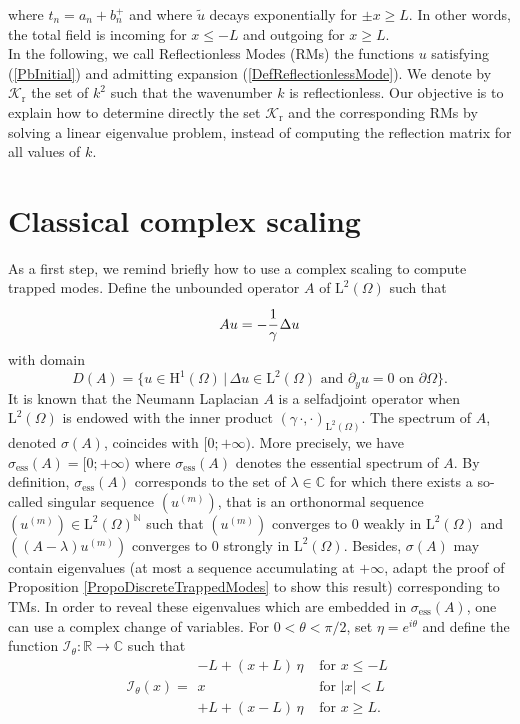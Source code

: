 \documentclass[11pt,a4paper]{report}
\newcommand{\Om}{\Omega}
\newcommand{\mrm}[1]{\mathrm{#1}}
\newcommand{\Cplx}{\mathbb{C}}
\newcommand{\N}{\mathbb{N}}
\newcommand{\R}{\mathbb{R}}
\newcommand{\mL}{\mrm{L}}
\newcommand{\mH}{\mrm{H}}
\begin{document}
where $t_n=a_n+b_n^+$ and where $\tilde{u}$ decays exponentially for $\pm x\ge L$. In other words, the total field is incoming for $x\le-L$ and outgoing for $x\ge L$.\\
\newline
In the following,  we call Reflectionless Modes (RMs) the functions $u$ satisfying (\ref{PbInitial}) and admitting expansion (\ref{DefReflectionlessMode}). We denote by $\mathscr{K}_{\mrm{r}}$ the set of $k^2$ such that the wavenumber $k$ is reflectionless. Our objective is to explain how to determine directly the set $\mathscr{K}_{\mrm{r}}$ and the corresponding RMs by solving a linear eigenvalue problem, instead of computing the reflection matrix for all values of $k$.  

\section{Classical complex scaling}\label{SectionClassical}
As a first step, we remind briefly how to use a complex scaling to compute trapped modes. Define the unbounded operator $A$ of $\mL^2(\Om)$ such that
\[ 
Au=-\cfrac{1}{\gamma}\,\Delta u
\]
with domain 
\[
D(A)=\{u\in\mH^1(\Om)\,|\,\Delta u\in \mL^2(\Om)\mbox{ and }\partial_{y}u=0\mbox{ on }\partial\Om\}.
\] 
It is known that the Neumann Laplacian $A$ is a selfadjoint operator when $\mL^2(\Om)$ is endowed with the inner product $(\gamma\,\cdot,\cdot)_{\mL^2(\Om)}$. The spectrum of $A$, denoted $\sigma(A)$, coincides with $[0;+\infty)$. More precisely, we have $\sigma_{\mrm{ess}}(A)=[0;+\infty)$ where $\sigma_{\mrm{ess}}(A)$ denotes the essential spectrum of $A$. By definition, $\sigma_{\mrm{ess}}(A)$ corresponds to the set of $\lambda \in\Cplx$ for which there exists a so-called singular sequence $(u^{(m)})$, that is an orthonormal sequence $(u^{(m)})\in\mL^2(\Omega)^{\N}$ such that $(u^{(m)})$ converges to 0 weakly in $\mL^2(\Omega)$ and $((A-\lambda)u^{(m)})$ converges to 0 strongly in $\mL^2(\Omega)$. 
Besides, $\sigma(A)$ may contain eigenvalues (at most a sequence accumulating at $+\infty$, adapt the proof of Proposition \ref{PropoDiscreteTrappedModes} to show this result) corresponding to TMs. In order to reveal these eigenvalues which are embedded in $\sigma_{\mrm{ess}}(A)$, one can use a complex change of variables. For $0<\theta<\pi/2$, set $\eta=e^{i\theta}$ and define the function $\mathcal{I}_{\theta}:\R\to\Cplx $ such that 
\begin{equation}\label{defDilatationx}
\mathcal{I}_{\theta}(x)=\begin{array}{|ll}
-L+(x+L)\,\eta&\mbox{ for }x\le- L\\
x&\mbox{ for }|x|< L\\
+ L+(x-L)\,\eta&\mbox{ for } x\ge L.
\end{array}
\end{equation}
\end{document}
